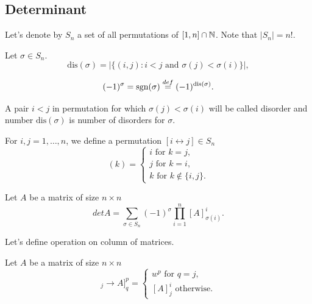 \documentclass[main.tex]{subfiles}
\begin{document}
\subsection{Determinant}

Let's denote by $S_n$ a set of all permutations of $[1, n]\cap\mathbb{N}$. Note that $|S_n| = n!$.
\begin{definition}
\label{permutation-sign}
Let $\sigma\in S_n$.
\begin{equation}
\text{dis}(\sigma) = {|\{(i,j): i < j \text{ and }\sigma(j) < \sigma(i)\}|},
\end{equation}

\begin{equation}
(-1)^\sigma = \text{sgn}(\sigma) \stackrel{def}{=} (-1)^{\text{dis}(\sigma)}.
\end{equation}

\end{definition}

A pair $i < j$ in permutation for which $\sigma(j) < \sigma(i)$ will be called disorder and number $\text{dis}(\sigma)$ is number of disorders for $\sigma$. 
\begin{definition}
For $i, j = 1, \dots, n$, we define a permutation $[i\leftrightarrow j]\in S_n$
\begin{equation}
[i\leftrightarrow j](k) = 
\begin{cases}
i \text{ for } k = j,\\
j \text{ for } k = i,\\
k \text{ for } k\not\in\{i,j\}.
\end{cases} 
\end{equation}
\end{definition}  

\begin{definition}
\label{det-def}
Let $A$ be a matrix of size $n \times n$
\begin{equation}
det A = \sum\limits_{\sigma\in S_n} (-1)^\sigma \prod_{i=1}^n [A]^i_{\sigma(i)}.
\end{equation}
\end{definition}

Let's define operation on column of matrices.
\begin{definition}
Let $A$ be a matrix of size $n \times n$
\begin{equation}
[[w^i]_j \to A]^p_q =
\begin{cases}
w^p \text { for } q=j,\\
[A]^i_j \text{ otherwise}.
\end{cases}
\end{equation}
\end{definition}
\end{document}
